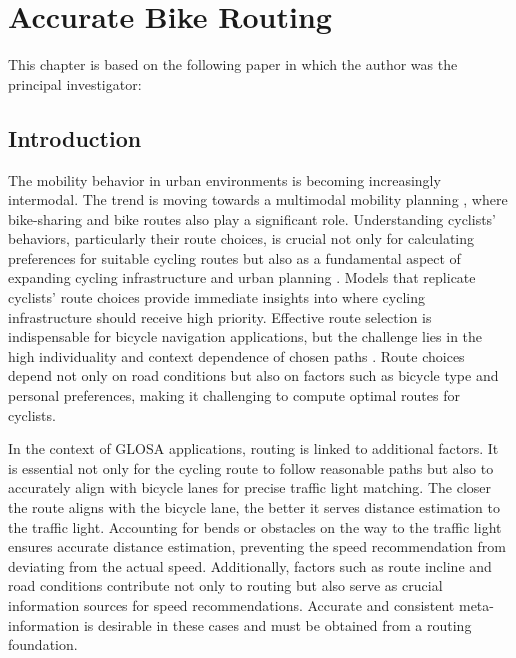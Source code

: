 \chapter{Accurate Bike Routing}\label{ch:routing}

\begin{Summary}
This chapter is based on the following paper in which the author was the principal investigator:

\cite{matthes2023accurate} 
\end{Summary}

\section{Introduction}

The mobility behavior in urban environments is becoming increasingly intermodal. The trend is moving towards a multimodal mobility planning \cite{park_framework_2023}, where bike-sharing and bike routes also play a significant role. Understanding cyclists' behaviors, particularly their route choices, is crucial not only for calculating preferences for suitable cycling routes but also as a fundamental aspect of expanding cycling infrastructure and urban planning \cite{zielstra_comparative_2011, huber_modelling_2021}. Models that replicate cyclists' route choices provide immediate insights into where cycling infrastructure should receive high priority. Effective route selection is indispensable for bicycle navigation applications, but the challenge lies in the high individuality and context dependence of chosen paths \cite{dill_revisiting_2016, schleinitz_german_2017, misra_modeling_2018}. Route choices depend not only on road conditions but also on factors such as bicycle type and personal preferences, making it challenging to compute optimal routes for cyclists.

In the context of GLOSA applications, routing is linked to additional factors. It is essential not only for the cycling route to follow reasonable paths but also to accurately align with bicycle lanes for precise traffic light matching. The closer the route aligns with the bicycle lane, the better it serves distance estimation to the traffic light. Accounting for bends or obstacles on the way to the traffic light ensures accurate distance estimation, preventing the speed recommendation from deviating from the actual speed. Additionally, factors such as route incline and road conditions contribute not only to routing but also serve as crucial information sources for speed recommendations. Accurate and consistent meta-information is desirable in these cases and must be obtained from a routing foundation.

